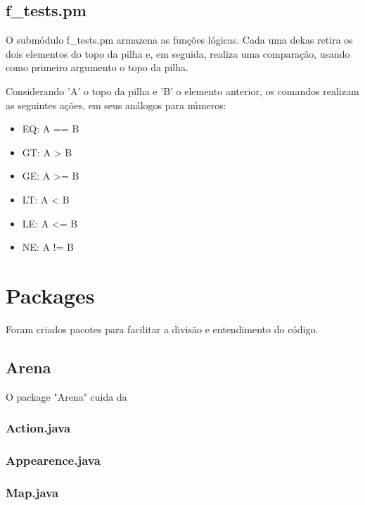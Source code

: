 \documentclass[a4paper]{article}
\begin{document}
    \subsection{f\_tests.pm}
            
        O submódulo f\_tests.pm armazena as funções lógicas. Cada uma
        dekas retira os dois elementos do topo da pilha e, em seguida,
        realiza uma comparação, usando como primeiro argumento o topo
        da pilha.
        
        Considerando 'A' o topo da pilha e 'B' o elemento anterior,
        os comandos realizam as seguintes ações, em seus análogos 
        para números:
        \begin{itemize}
            \item EQ: A == B
            \item GT: A >  B
            \item GE: A >= B
            \item LT: A <  B
            \item LE: A <= B
            \item NE: A != B
        \end{itemize}
    











\newpage
\newpage

\section{Packages}
	Foram criados pacotes para facilitar a divisão
	e entendimento do código.
	
	\subsection{Arena}
		O package "Arena" cuida da 
		\subsubsection{ Action.java }
		\subsubsection{ Appearence.java }
		\subsubsection{ Map.java }
\end{document}
